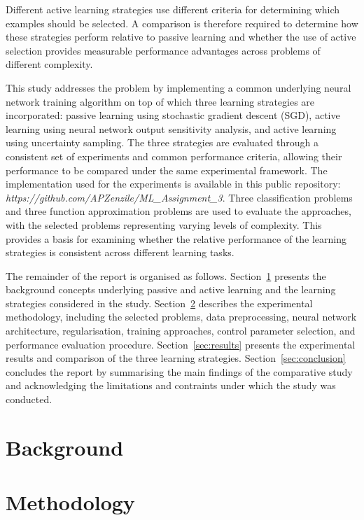 \documentclass[conference]{IEEEtran}
\begin{document}
Different active learning strategies use different criteria for determining which examples should be selected. 
A comparison is therefore required to determine how these strategies perform relative to passive learning and 
whether the use of active selection provides measurable performance advantages across problems of different complexity.

This study addresses the problem by implementing a common underlying neural network training algorithm on top of which three learning strategies 
are incorporated: passive learning using stochastic gradient descent (SGD), active learning using neural network output sensitivity analysis, 
and active learning using uncertainty sampling. The three strategies are evaluated through a consistent set of experiments and common 
performance criteria, allowing their performance to be compared under the same experimental framework. The implementation used for the experiments 
is available in this public repository: \textit{https://github.com/APZenzile/ML\_Assignment\_3}. Three classification problems and 
three function approximation problems are used to evaluate the approaches, with the selected problems representing varying levels of complexity. 
This provides a basis for examining whether the relative performance of the learning strategies is consistent across different learning tasks.

The remainder of the report is organised as follows. Section~\ref{sec:background} presents the background concepts underlying passive and active 
learning and the learning strategies considered in the study. Section~\ref{sec:methodology} describes the experimental methodology, including the 
selected problems, data preprocessing, neural network architecture, regularisation, training approaches, control parameter selection, and performance 
evaluation procedure. Section~\ref{sec:results} presents the experimental results and comparison of the three learning strategies. Section~\ref{sec:conclusion} 
concludes the report by summarising the main findings of the comparative study and acknowledging the limitations and contraints under which the study was conducted.

\section{Background}
\label{sec:background}




\section{Methodology}
\label{sec:methodology}
\end{document}
